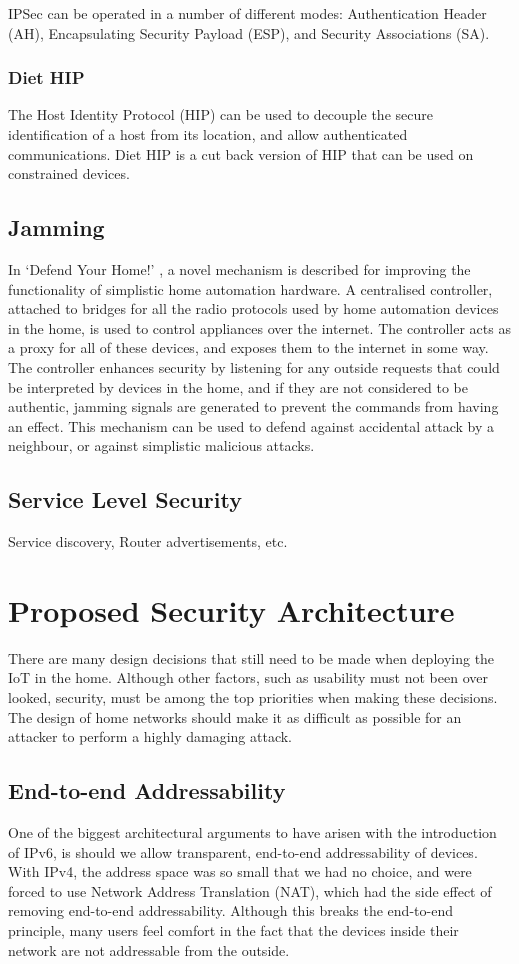 \documentclass[10pt,journal,compsoc]{IEEEtran}
\begin{document}
IPSec can be operated in a number of different modes: Authentication Header
(AH), Encapsulating Security Payload (ESP), and Security Associations (SA).

\subsubsection{Diet HIP}
The Host Identity Protocol (HIP) can be used to decouple the secure
identification of a host from its location, and allow authenticated
communications. Diet HIP is a cut back version of HIP that can be used on
constrained devices. 

\subsection{Jamming}
In `Defend Your Home!' \cite{Brown2013}, a novel mechanism is described for
improving the functionality of simplistic home automation hardware. A
centralised controller, attached to bridges for all the radio protocols used by
home automation devices in the home, is used to control appliances over the
internet. The  controller acts as a proxy for all of these devices, and exposes
them to the internet in some way. The controller  enhances security by
listening for any outside requests that could be interpreted by devices in the
home, and if they are not considered to be authentic, jamming signals are
generated to prevent the commands from having an effect. This mechanism can be
used to defend against accidental attack by a neighbour, or against simplistic
malicious attacks. 

\subsection{Service Level Security}
Service discovery, Router advertisements, etc.

\section{Proposed Security Architecture}
There are many design decisions that still need to be made when deploying the
IoT in the home. Although other factors, such as usability must not been over
looked, security, must be among the top priorities when making these decisions.
The design of home networks should make it as difficult as possible for an
attacker to perform a highly damaging attack. 

\subsection{End-to-end Addressability}
One of the biggest architectural arguments to have arisen with the introduction
of IPv6, is should we allow transparent, end-to-end addressability of devices.
With IPv4, the address space was so small that we had no choice, and were
forced to use Network Address Translation (NAT), which had the side effect of
removing end-to-end addressability. Although this breaks the end-to-end
principle, many users feel comfort in the fact that the devices inside their
network are not addressable from the outside.  
\end{document}
